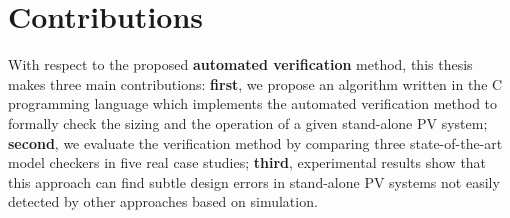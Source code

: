 \section{Contributions}

With respect to the proposed \textbf{automated verification} method, this thesis makes three main contributions: \textbf{first}, we propose an algorithm written in the C programming language which implements the automated verification method to formally check the sizing and the operation of a given stand-alone PV system; \textbf{second}, we evaluate the verification method by comparing three state-of-the-art model checkers in five real case studies; \textbf{third}, experimental results show that this approach can find subtle design errors in stand-alone PV systems not easily detected by other approaches based on simulation.

